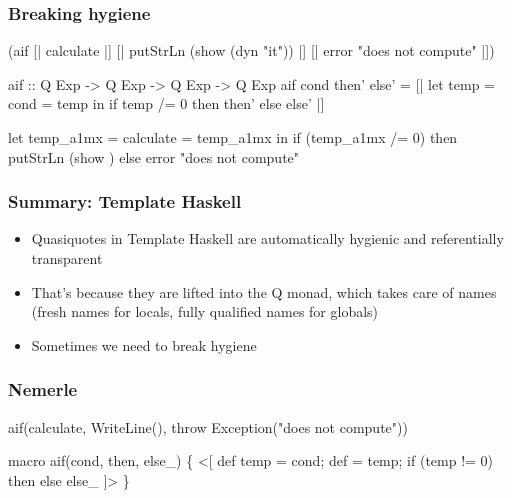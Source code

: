 \documentclass[hyperref={bookmarks=false}]{beamer}
\begin{document}
\begin{frame}[fragile]
\frametitle{Breaking hygiene}
\begin{semiverbatim}
{\textdollar}(aif [| calculate |]
  [| putStrLn (show \alert{{\textdollar}(dyn "it")}) |]
  [| error "does not compute" |])

aif :: Q Exp -> Q Exp -> Q Exp -> Q Exp
aif cond then' else' =
  [| let temp = {\textdollar}cond
         \text{\color{red}{it}} = temp
     in if temp /= 0 then {\textdollar}then' else {\textdollar}else' |]

let temp_a1mx = calculate
    \text{\color{red}{it_a1my}} = temp_a1mx
in if (temp_a1mx /= 0)
   then putStrLn (show \text{\color{blue}{it_a1my}})
   else error "does not compute"
\end{semiverbatim}
\end{frame}

\begin{frame}[fragile]
\frametitle{Summary: Template Haskell}
\begin{itemize}
\item Quasiquotes in Template Haskell are automatically hygienic and referentially transparent
\item That's because they are lifted into the Q monad, which takes care of names (fresh names for locals,
fully qualified names for globals)
\item Sometimes we need to break hygiene
\end{itemize}
\end{frame}

\begin{frame}[fragile]
\frametitle{Nemerle}
\begin{semiverbatim}
aif(calculate,
  WriteLine(),
  throw Exception("does not compute"))

macro aif(cond, then, else_) \{
  <[
    def temp = {\textdollar}cond;
    def  = temp;
    if (temp != 0) {\textdollar}then else {\textdollar}else_
  ]>
\}


\end{semiverbatim}
\end{frame}
\end{document}

